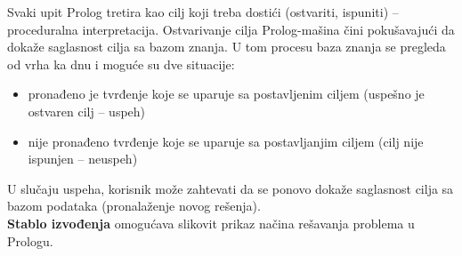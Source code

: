 \documentclass[../main.tex]{subfiles}
\begin{document}
Svaki upit Prolog tretira kao cilj koji treba dostići (ostvariti, ispuniti) -- proceduralna interpretacija. Ostvarivanje cilja Prolog-mašina čini pokušavajući da dokaže saglasnost cilja sa bazom znanja. U tom procesu baza znanja se pregleda od vrha ka dnu i moguće su dve situacije: 
\begin{itemize}
\item pronađeno je tvrđenje koje se uparuje sa postavljenim ciljem (uspešno je ostvaren cilj -- uspeh)
\item nije pronađeno tvrđenje koje se uparuje sa postavljanjim ciljem (cilj nije ispunjen -- neuspeh)
\end{itemize}
U slučaju uspeha, korisnik može zahtevati da se ponovo dokaže saglasnost cilja sa bazom podataka (pronalaženje novog rešenja).
\\
{\bf Stablo izvođenja} omogućava slikovit prikaz načina rešavanja problema u Prologu.
\end{document}
